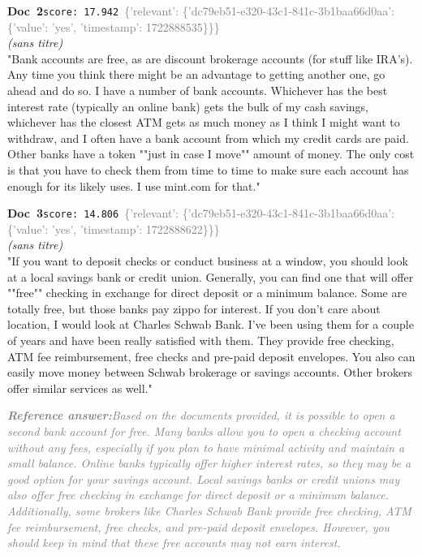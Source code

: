 \documentclass[a4paper,11pt]{article}
\begin{document}
\begin{docenv}
{\footnotesize\textcolor{doccolor}{\textbf{Doc~2}}}\hfill{\tiny\texttt{score:~17.942}}\ {\tiny\textcolor{gray}{\{'relevant': \{'dc79eb51-e320-43c1-841c-3b1baa66d0aa': \{'value': 'yes', 'timestamp': 1722888535\}\}\}}}\\[3pt]
{\small\textit{(sans titre)}}\\[2pt]
\vspace{2pt}
{\footnotesize 
"Bank accounts are free, as are discount brokerage accounts (for stuff like IRA's).  Any time you think there might be an advantage to getting another one, go ahead and do so. I have a number of bank accounts.  Whichever has the best interest rate (typically an online bank) gets the bulk of my cash savings, whichever has the closest ATM gets as much money as I think I might want to withdraw, and I often have a bank account from which my credit cards are paid. Other banks have a token ""just in case I move"" amount of money. The only cost is that you have to check them from time to time to make sure each account has enough for its likely uses.  I use mint.com for that."}
\end{docenv}
\begin{docenv}
{\footnotesize\textcolor{doccolor}{\textbf{Doc~3}}}\hfill{\tiny\texttt{score:~14.806}}\ {\tiny\textcolor{gray}{\{'relevant': \{'dc79eb51-e320-43c1-841c-3b1baa66d0aa': \{'value': 'yes', 'timestamp': 1722888622\}\}\}}}\\[3pt]
{\small\textit{(sans titre)}}\\[2pt]
\vspace{2pt}
{\footnotesize 
"If you want to deposit checks or conduct business at a window, you should look at a local savings bank or credit union. Generally, you can find one that will offer ""free"" checking in exchange for direct deposit or a minimum balance. Some are totally free, but those banks pay zippo for interest. If you don't care about location, I would look at Charles Schwab Bank. I've been using them for a couple of years and have been really satisfied with them. They provide free checking, ATM fee reimbursement, free checks and pre-paid deposit envelopes. You also can easily move money between Schwab brokerage or savings accounts. Other brokers offer similar services as well."}
\end{docenv}
\begin{refanswerenv}
{\footnotesize\textit{\textcolor{gray}{\textbf{Reference answer:}\enspace Based on the documents provided, it is possible to open a second bank account for free. Many banks allow you to open a checking account without any fees, especially if you plan to have minimal activity and maintain a small balance. Online banks typically offer higher interest rates, so they may be a good option for your savings account. Local savings banks or credit unions may also offer free checking in exchange for direct deposit or a minimum balance. Additionally, some brokers like Charles Schwab Bank provide free checking, ATM fee reimbursement, free checks, and pre-paid deposit envelopes. However, you should keep in mind that these free accounts may not earn interest.}}}
\end{refanswerenv}
\end{document}
